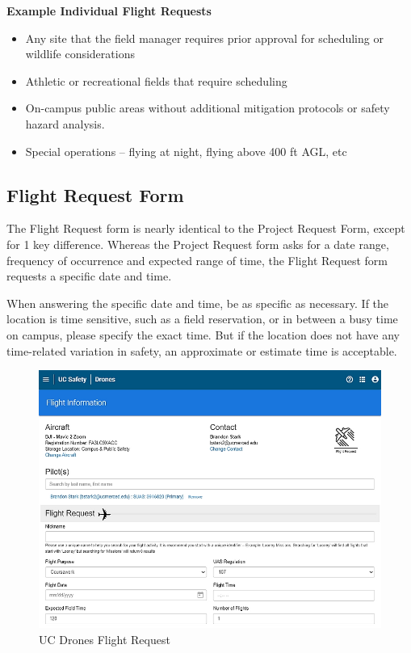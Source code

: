 \documentclass[
  12pt,
]{book}
\providecommand{\tightlist}{%
  \setlength{\itemsep}{0pt}\setlength{\parskip}{0pt}}
\begin{document}
\textbf{Example Individual Flight Requests}

\begin{itemize}
\tightlist
\item
  Any site that the field manager requires prior approval for scheduling or wildlife considerations
\item
  Athletic or recreational fields that require scheduling
\item
  On-campus public areas without additional mitigation protocols or safety hazard analysis.
\item
  Special operations -- flying at night, flying above 400 ft AGL, etc
\end{itemize}

\hypertarget{flight-request-form}{%
\subsection{Flight Request Form}\label{flight-request-form}}

The Flight Request form is nearly identical to the Project Request Form, except for 1 key difference. Whereas the Project Request form asks for a date range, frequency of occurrence and expected range of time, the Flight Request form requests a specific date and time.

When answering the specific date and time, be as specific as necessary. If the location is time sensitive, such as a field reservation, or in between a busy time on campus, please specify the exact time. But if the location does not have any time-related variation in safety, an approximate or estimate time is acceptable.

\begin{figure}

{\centering \includegraphics[width=0.85\linewidth]{images/UCDrones_flight_request} 

}

\caption{UC Drones Flight Request}\label{fig:UCDrones-flight-request}
\end{figure}
\end{document}

